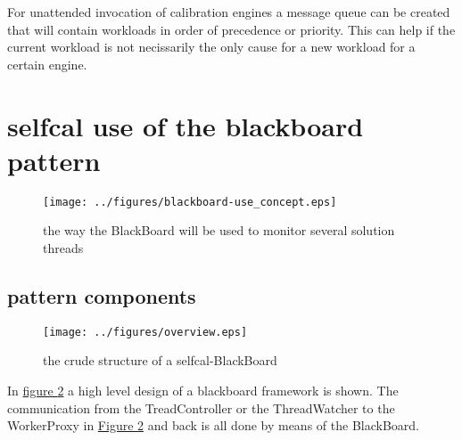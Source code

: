 \documentclass[]{lofar}
\begin{document}
    For unattended invocation of calibration engines a message queue
    can be created that will contain workloads in order of precedence
    or priority. This can help if the current workload is not
    necissarily the only cause for a new workload for a certain
    engine.

  \section{selfcal use of the blackboard pattern}
  \label{sec:selfcal-use-blackboard}
  \begin{figure}
    \texttt{[image: ../figures/blackboard-use\_concept.eps]}
    \hypertarget{fig:blackboard-use}{}
    \caption{the way the BlackBoard will be used to monitor several
    solution threads\label{fig:blackboard-use}}
  \end{figure}

    \subsection{pattern components}
    \label{subsec:pattern-components}

      \begin{figure}
        \texttt{[image: ../figures/overview.eps]}
        \hypertarget{fig:overview}{}
        \caption{the crude structure of a selfcal-BlackBoard\label{fig:overview}}
      \end{figure}

      In \hyperlink{fig:overview}{figure \ref{fig:overview}} a high
      level design of a blackboard framework is shown. The
      communication from the TreadController or the ThreadWatcher to
      the WorkerProxy in \hyperlink{fig:overview}{Figure
      \ref{fig:overview}} and back is all done by means of the
      BlackBoard.
\end{document}
